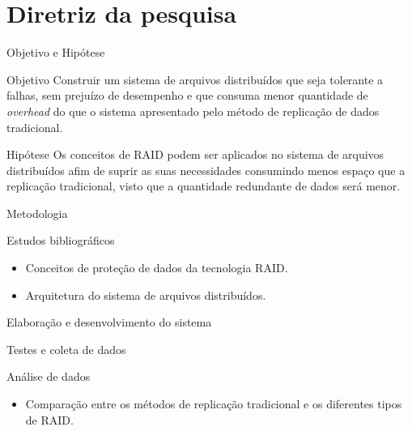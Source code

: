 \section{Diretriz da pesquisa}

\begin{frame}{Objetivo e Hipótese}
	
	\begin{block}{Objetivo}
		Construir um sistema de arquivos distribuídos que seja tolerante a falhas, sem prejuízo de desempenho e que consuma menor quantidade de \textit{overhead} do que o sistema apresentado pelo método de replicação de dados tradicional.
		
	\end{block}
	
	\begin{block}{Hipótese}
		Os conceitos de RAID podem ser aplicados no sistema de arquivos distribuídos afim de suprir as suas necessidades consumindo menos espaço que a replicação tradicional, visto que a quantidade redundante de dados será menor. 
		
	\end{block}
	
\end{frame}

\begin{frame}{Metodologia}
	
	\begin{block}{Estudos bibliográficos}
		\begin{itemize}
			\item Conceitos de proteção de dados da tecnologia RAID.
			\item Arquitetura do sistema de arquivos distribuídos.
		\end{itemize}
	\end{block}
	
	\begin{block}{Elaboração e desenvolvimento do sistema}
		
	\end{block}
	
	\begin{block}{Testes e coleta de dados}
		
	\end{block}
	
	\begin{block}{Análise de dados}
		\begin{itemize}
			\item Comparação entre os métodos de replicação tradicional e os diferentes tipos de RAID.
		\end{itemize}
		
	\end{block}
	
\end{frame}